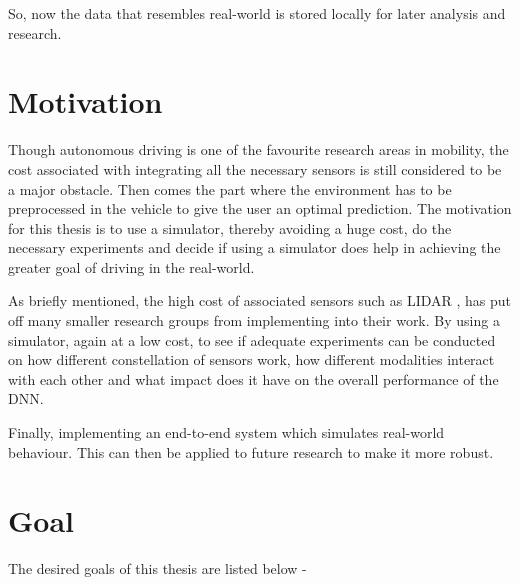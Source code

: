 So, now the data that resembles real-world is stored locally for later analysis and
research.

\section{Motivation}

Though autonomous driving is one of the favourite research areas in mobility, the cost
associated with integrating all the necessary sensors is still considered to be a major obstacle. Then
comes the part where the environment has to be preprocessed in the vehicle to give the
user an optimal prediction. The motivation for this thesis is to use a simulator, thereby
avoiding a huge cost, do the necessary experiments and decide if using a simulator does
help in achieving the greater goal of driving in the real-world. 

As briefly mentioned, the high cost of associated sensors such as LIDAR
\cite{VergeReportLidar},  has put off many smaller research groups from implementing into their
work. By using a simulator, again at a low cost, to see if adequate experiments can be
conducted on how different constellation of sensors work, how different modalities
interact with each other and what impact does it have on the overall performance of the DNN.

Finally, implementing an end-to-end system which simulates real-world behaviour. This can
then be applied to future research to make it more robust.


\section{Goal}
    The desired goals of this thesis are listed below - 

